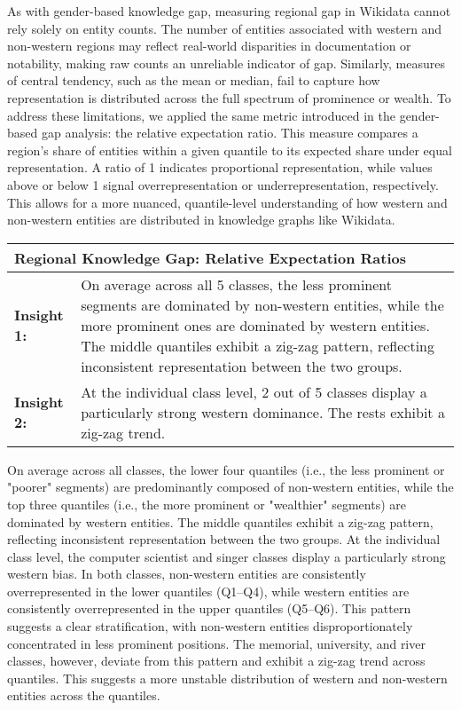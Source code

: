 As with gender-based knowledge gap, measuring regional gap in Wikidata cannot rely solely on entity counts. The number of entities associated with western and non-western regions may reflect real-world disparities in documentation or notability, making raw counts an unreliable indicator of gap. Similarly, measures of central tendency, such as the mean or median, fail to capture how representation is distributed across the full spectrum of prominence or wealth. To address these limitations, we applied the same metric introduced in the gender-based gap analysis: the relative expectation ratio. This measure compares a region's share of entities within a given quantile to its expected share under equal representation. A ratio of 1 indicates proportional representation, while values above or below 1 signal overrepresentation or underrepresentation, respectively. This allows for a more nuanced, quantile-level understanding of how western and non-western entities are distributed in knowledge graphs like Wikidata.

\begin{table}[h]
    \centering
    \renewcommand{\arraystretch}{1.3}
    \begin{tabular}{|l p{12cm}|} 
        \hline
        \multicolumn{2}{|l|}{\textbf{Regional Knowledge Gap: Relative Expectation Ratios}} \\
        \hline
        \textbf{Insight 1:} & On average across all 5 classes, the less prominent segments are dominated by non-western entities, while the more prominent ones are dominated by western entities. The middle quantiles exhibit a zig-zag pattern, reflecting inconsistent representation between the two groups. \\
        \textbf{Insight 2:} & At the individual class level, 2 out of 5 classes display a particularly strong western dominance. The rests exhibit a zig-zag trend. \\
        \hline
    \end{tabular}
\end{table}

On average across all classes, the lower four quantiles (i.e., the less prominent or "poorer" segments) are predominantly composed of non-western entities, while the top three quantiles (i.e., the more prominent or "wealthier" segments) are dominated by western entities. The middle quantiles exhibit a zig-zag pattern, reflecting inconsistent representation between the two groups. At the individual class level, the computer scientist and singer classes display a particularly strong western bias. In both classes, non-western entities are consistently overrepresented in the lower quantiles (Q1–Q4), while western entities are consistently overrepresented in the upper quantiles (Q5–Q6). This pattern suggests a clear stratification, with non-western entities disproportionately concentrated in less prominent positions. The memorial, university, and river classes, however, deviate from this pattern and exhibit a zig-zag trend across quantiles. This suggests a more unstable distribution of western and non-western entities across the quantiles.

